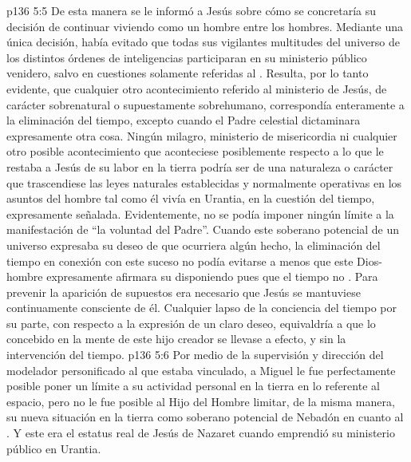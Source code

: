 \vs p136 5:5 \pc De esta manera se le informó a Jesús sobre cómo se concretaría su decisión de continuar viviendo como un hombre entre los hombres. Mediante una única decisión, había evitado que todas sus vigilantes multitudes del universo de los distintos órdenes de inteligencias participaran en su ministerio público venidero, salvo en cuestiones solamente referidas al . Resulta, por lo tanto evidente, que cualquier otro acontecimiento referido al ministerio de Jesús, de carácter sobrenatural o supuestamente sobrehumano, correspondía enteramente a la eliminación del tiempo, excepto cuando el Padre celestial dictaminara expresamente otra cosa. Ningún milagro, ministerio de misericordia ni cualquier otro posible acontecimiento que aconteciese posiblemente respecto a lo que le restaba a Jesús de su labor en la tierra podría ser de una naturaleza o carácter que trascendiese las leyes naturales establecidas y normalmente operativas en los asuntos del hombre tal como él vivía en Urantia,  en la cuestión del tiempo, expresamente señalada. Evidentemente, no se podía imponer ningún límite a la manifestación de “la voluntad del Padre”. Cuando este soberano potencial de un universo expresaba su deseo de que ocurriera algún hecho, la eliminación del tiempo en conexión con este suceso no podía evitarse a menos que este Dios\hyp{}hombre expresamente afirmara su  disponiendo pues que el tiempo no . Para prevenir la aparición de supuestos  era necesario que Jesús se mantuviese continuamente consciente de él. Cualquier lapso de la conciencia del tiempo por su parte, con respecto a la expresión de un claro deseo, equivaldría a que lo concebido en la mente de este hijo creador se llevase a efecto, y sin la intervención del tiempo.
\vs p136 5:6 Por medio de la supervisión y dirección del modelador personificado al que estaba vinculado, a Miguel le fue perfectamente posible poner un límite a su actividad personal en la tierra en lo referente al espacio, pero no le fue posible al Hijo del Hombre limitar, de la misma manera, su nueva situación en la tierra como soberano potencial de Nebadón en cuanto al . Y este era el estatus real de Jesús de Nazaret cuando emprendió su ministerio público en Urantia.
